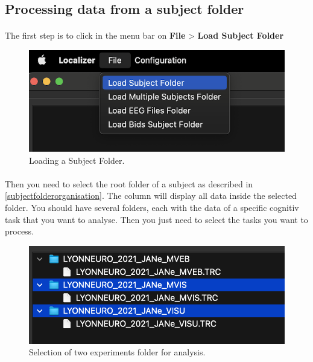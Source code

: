 \documentclass[a4paper]{article}
\begin{document}
\subsection{Processing data from a subject folder}

\paragraph{} The first step is to click in the menu bar on \textbf{File} > \textbf{Load Subject Folder}
\begin{figure}[H]
\begin{center}
\includegraphics[scale=0.8]{SelectLoadSubjectFolder.png}
\end{center}
\caption{\label{LoadSubjectFolder}Loading a Subject Folder.}
\end{figure}

\paragraph{} Then you need to select the root folder of a subject as described in \ref{subjectfolderorganisation}. The column will display all data inside the selected folder. You should have several folders, each with the data of a specific cognitiv task that you want to analyse. Then you just need to select the tasks you want to process.
\begin{figure}[H]
\begin{center}
\includegraphics[scale=0.8]{SubjectFolderSelect.png}
\end{center}
\caption{\label{FolderSelectionUI}Selection of two experiments folder for analysis.}
\end{figure}
\end{document}
